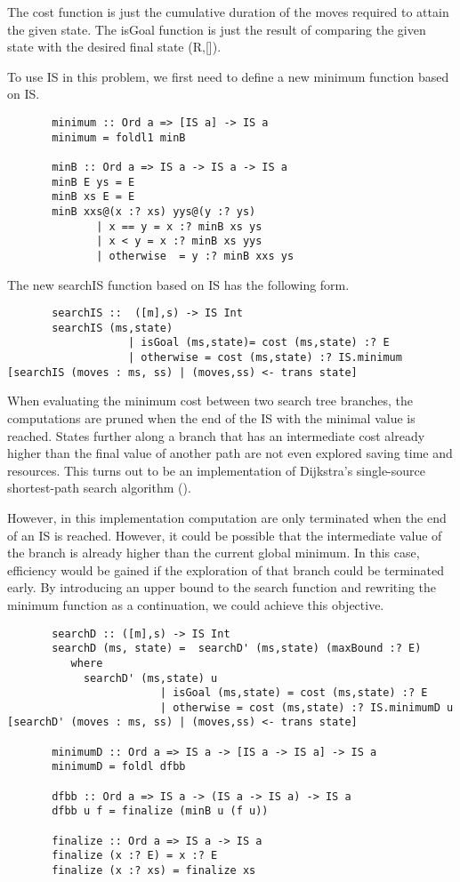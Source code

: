\documentclass[journal,onecolumn]{IEEEtran}
\begin{document}
The \textsf{cost} function is just the cumulative duration of the moves required to attain the given state. The \textsf{isGoal} function is just the result of comparing the given state with the desired final state \textsf{(R,[])}.

To use IS in this problem, we first need to define a new \textsf{minimum} function based on IS.
\begin{lstlisting}
       minimum :: Ord a => [IS a] -> IS a
       minimum = foldl1 minB

       minB :: Ord a => IS a -> IS a -> IS a
       minB E ys = E
       minB xs E = E
       minB xxs@(x :? xs) yys@(y :? ys)
              | x == y = x :? minB xs ys
              | x < y = x :? minB xs yys
              | otherwise  = y :? minB xxs ys
\end{lstlisting}

The new \textsf{searchIS} function based on IS has the following form.
\begin{lstlisting} 
       searchIS ::  ([m],s) -> IS Int
       searchIS (ms,state)
                   | isGoal (ms,state)= cost (ms,state) :? E
                   | otherwise = cost (ms,state) :? IS.minimum [searchIS (moves : ms, ss) | (moves,ss) <- trans state]
\end{lstlisting}

When evaluating the minimum cost between two search tree branches, the computations are pruned when the end of the IS with the minimal value is reached.  States further along a branch that has an intermediate cost already higher than the final value of another path are not even explored saving time and resources.  This turns out to be an implementation of Dijkstra’s single-source shortest-path
search algorithm (\cite{dijkstra}).

However, in this implementation computation are only terminated when the end of an IS is reached.  However, it could be possible that the intermediate value of the branch is already higher than the current global minimum.  In this case, efficiency would be gained if the exploration of that branch could be terminated early.  By introducing an upper bound to the search function and rewriting the minimum function as a continuation, we could achieve this objective.
\begin{lstlisting}
       searchD :: ([m],s) -> IS Int
       searchD (ms, state) =  searchD' (ms,state) (maxBound :? E)
          where
            searchD' (ms,state) u
                        | isGoal (ms,state) = cost (ms,state) :? E
                        | otherwise = cost (ms,state) :? IS.minimumD u [searchD' (moves : ms, ss) | (moves,ss) <- trans state]

       minimumD :: Ord a => IS a -> [IS a -> IS a] -> IS a
       minimumD = foldl dfbb
       
       dfbb :: Ord a => IS a -> (IS a -> IS a) -> IS a
       dfbb u f = finalize (minB u (f u))

       finalize :: Ord a => IS a -> IS a
       finalize (x :? E) = x :? E
       finalize (x :? xs) = finalize xs
\end{lstlisting}
\end{document}
